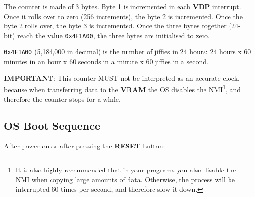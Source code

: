 \documentclass[a4paper,11pt]{article}
\begin{document}
    The counter is made of 3 bytes. Byte 1 is incremented in each \textbf{VDP}
    interrupt. Once it rolls over to zero (256 increments), the byte 2 is
    incremented. Once the byte 2 rolls over, the byte 3 is incremented. Once the
    three bytes together (24-bit) reach the value \texttt{0x4F1A00}, the three
    bytes are initialised to zero.

    \texttt{0x4F1A00} (5,184,000 in decimal) is the number of jiffies in 24
    hours: 24 hours x 60 minutes in an hour x 60 seconds in a minute x 60
    jiffies in a second.

    \textbf{IMPORTANT}: This counter MUST not be interpreted as an accurate
    clock, because when transferring data to the \textbf{VRAM} the OS disables
    the \hyperref[sec:nmi]{NMI}\footnote{It is also highly recommended that in
    your programs you also disable the \hyperref[sec:nmi]{NMI} when copying
    large amounts of data. Otherwise, the process will be interrupted 60 times
    per second, and therefore slow it down.}, and therefore the counter stops
    for a while.

    \subsection{OS Boot Sequence}
    After power on or after pressing the \textbf{RESET} button:
\end{document}
